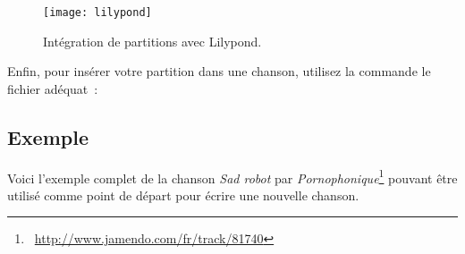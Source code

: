 \begin{figure}
  \begin{minipage}[b]{\linewidth}
    \centering
    \texttt{[image: lilypond]}
    \vspace{0.5cm}
  \end{minipage}

  \begin{minipage}[b]{\linewidth}
  \end{minipage}
  \caption{Intégration de partitions avec Lilypond.}
  \label{fig:lilypond}
\end{figure}

Enfin, pour insérer votre partition  dans une
chanson, utilisez la commande  le fichier
 adéquat~:

\begin{songbook}
\end{songbook}

\subsection{Exemple}

Voici l'exemple complet de la chanson \emph{Sad robot} par
\emph{Pornophonique}\footnote{\byncnd~\url{http://www.jamendo.com/fr/track/81740}}
pouvant être utilisé comme point de départ pour écrire une nouvelle
chanson.

